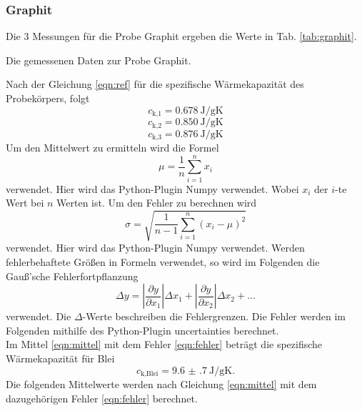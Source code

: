 \subsubsection{Graphit}
Die 3 Messungen für die Probe Graphit ergeben die Werte in Tab. \ref{tab:graphit}.
\begin{table}
    \centering
    \caption{Die gemessenen Daten zur Probe Graphit. }
    \label{tab:graphit}  
\end{table}
Nach der Gleichung \eqref{eqn:ref} für die spezifische Wärmekapazität des Probekörpers, folgt
\begin{equation}
    c_\text{k,1} = \SI{0.678}{\joule/\gram\kelvin}
\end{equation}
\begin{equation}
    c_\text{k,2} = \SI{0.850}{\joule/\gram\kelvin}
\end{equation}
\begin{equation}
    c_\text{k,3} = \SI{0.876}{\joule/\gram\kelvin}
\end{equation}
Um den Mittelwert zu ermitteln wird die Formel
\begin{equation}
    \mu = \frac{1}{n} \sum_{i=1}^n x_i
    \label{eqn:mittel}
\end{equation}
verwendet. Hier wird das Python-Plugin Numpy \cite{numpy} verwendet.
Wobei $x_i$ der $i$-te Wert bei $n$ Werten ist.
Um den Fehler zu berechnen wird
\begin{equation}
    \sigma = \sqrt{\frac{1}{n-1} \sum_{i=1}^n (x_i - \mu)^2}
    \label{eqn:fehler}
\end{equation}
verwendet. Hier wird das Python-Plugin Numpy \cite{numpy} verwendet.
Werden fehlerbehaftete Größen in Formeln verwendet, so wird im Folgenden die Gauß'sche Fehlerfortpflanzung 
\begin{equation}
    \Delta y = \left|\frac{\partial y}{\partial x_1}\right| \Delta x_1 + \left|\frac{\partial y}{\partial x_2}\right| \Delta x_2 + ...
\end{equation}
verwendet. Die $\Delta$-Werte beschreiben die Fehlergrenzen.
Die Fehler werden im Folgenden mithilfe des Python-Plugin uncertainties \cite{uncertainties} berechnet.
\\
Im Mittel \eqref{eqn:mittel} mit dem Fehler \eqref{eqn:fehler} beträgt die spezifische Wärmekapazität für Blei
\begin{equation}
    c_\text{k,Blei} = \SI{9.6(7)}{\joule/\gram\kelvin} .
\end{equation}
Die folgenden Mittelwerte werden nach Gleichung \eqref{eqn:mittel} mit dem dazugehörigen Fehler \eqref{eqn:fehler} berechnet.

